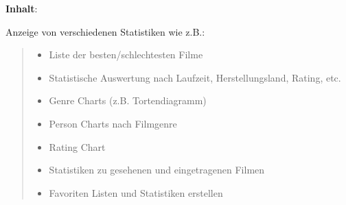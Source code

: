 \documentclass[a4paper]{article}
\begin{document}
\textbf{Inhalt}:

Anzeige von verschiedenen Statistiken wie z.B.:
%
\begin{quote}
%
\begin{itemize}

\item Liste der besten/schlechtesten Filme

\item Statistische Auswertung nach Laufzeit, Herstellungsland, Rating, etc.

\item Genre Charts (z.B. Tortendiagramm)

\item Person Charts nach Filmgenre

\item Rating Chart

\item Statistiken zu gesehenen und eingetragenen Filmen

\item Favoriten Listen und Statistiken erstellen

\end{itemize}

\end{quote}
\end{document}

